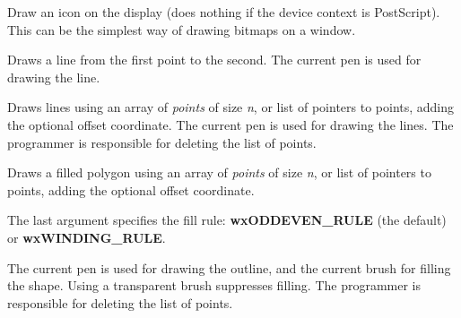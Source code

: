 \label{wxdcdrawicon}


Draw an icon on the display (does nothing if the device context is PostScript).
This can be the simplest way of drawing bitmaps on a window.

\label{wxdcdrawline}


Draws a line from the first point to the second. The current pen is used
for drawing the line.

\label{wxdcdrawlines}



Draws lines using an array of {\it points} of size {\it n}, or list of
pointers to points, adding the optional offset coordinate. The current
pen is used for drawing the lines.  The programmer is responsible for
deleting the list of points.


\label{wxdcdrawpolygon}



Draws a filled polygon using an array of {\it points} of size {\it n},
or list of pointers to points, adding the optional offset coordinate.

The last argument specifies the fill rule: {\bf wxODDEVEN\_RULE} (the
default) or {\bf wxWINDING\_RULE}.

The current pen is used for drawing the outline, and the current brush
for filling the shape.  Using a transparent brush suppresses filling.
The programmer is responsible for deleting the list of points.

